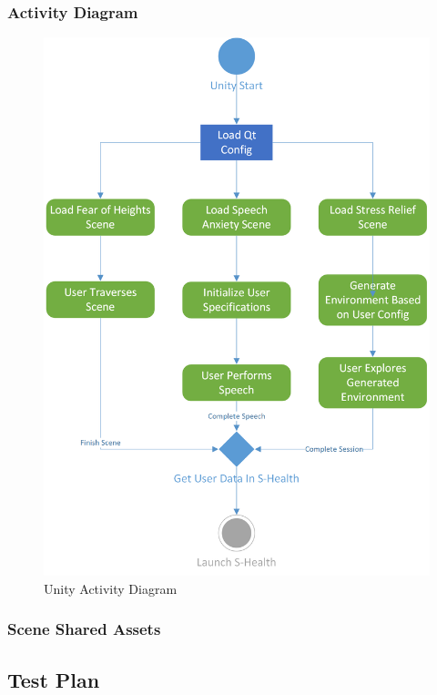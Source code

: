\documentclass[a4paper,10pt,twoside]{article}
\begin{document}
		\subsubsection{Activity Diagram}
				\begin{figure}[H]
					\centerline{\includegraphics[]{unityActivityDiag.png}}
					\caption{Unity Activity Diagram}
					\label{fig:unityactivity}
				\end{figure}
				\pagebreak
		\subsubsection{Scene Shared Assets}
	\subsection{Test Plan}
\end{document}
